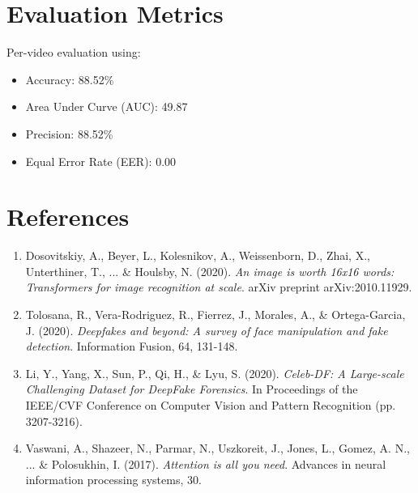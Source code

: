\documentclass[11pt]{article}
\begin{document}
\section{Evaluation Metrics}
Per-video evaluation using:
\begin{itemize}
    \item Accuracy: 88.52\%
    \item Area Under Curve (AUC): 49.87
    \item Precision: 88.52\%
    \item Equal Error Rate (EER): 0.00
\end{itemize}

\section{References}
\begin{enumerate}
  \item Dosovitskiy, A., Beyer, L., Kolesnikov, A., Weissenborn, D., Zhai, X., Unterthiner, T., ... \& Houlsby, N. (2020). \textit{An image is worth 16x16 words: Transformers for image recognition at scale}. arXiv preprint arXiv:2010.11929.
  \item Tolosana, R., Vera-Rodriguez, R., Fierrez, J., Morales, A., \& Ortega-Garcia, J. (2020). \textit{Deepfakes and beyond: A survey of face manipulation and fake detection}. Information Fusion, 64, 131-148.
  \item Li, Y., Yang, X., Sun, P., Qi, H., \& Lyu, S. (2020). \textit{Celeb-DF: A Large-scale Challenging Dataset for DeepFake Forensics}. In Proceedings of the IEEE/CVF Conference on Computer Vision and Pattern Recognition (pp. 3207-3216).
  \item Vaswani, A., Shazeer, N., Parmar, N., Uszkoreit, J., Jones, L., Gomez, A. N., ... \& Polosukhin, I. (2017). \textit{Attention is all you need}. Advances in neural information processing systems, 30.
\end{enumerate}
\end{document}
